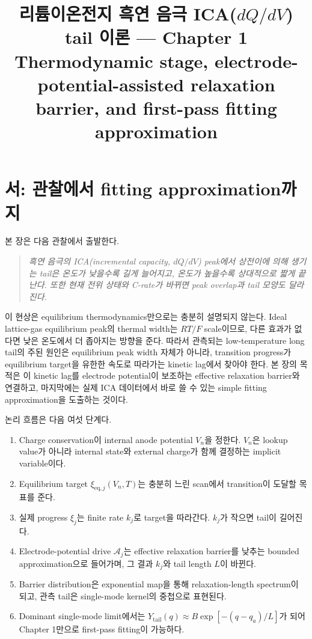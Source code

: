 \documentclass[11pt,a4paper]{article}
\title{\textbf{리튬이온전지 흑연 음극 ICA($dQ/dV$) tail 이론 --- Chapter 1}\\[0.4em]
\large Thermodynamic stage, electrode-potential-assisted relaxation barrier, and first-pass fitting approximation}
\author{}\date{}
\newcommand{\eq}{\mathrm{eq}}
\newcommand{\tail}{\mathrm{tail}}
\begin{document}
\maketitle

\section*{서: 관찰에서 fitting approximation까지}
본 장은 다음 관찰에서 출발한다.
\begin{quote}\itshape
흑연 음극의 ICA(incremental capacity, $dQ/dV$) peak에서 상전이에 의해 생기는 tail은 온도가 낮을수록 길게 늘어지고,
온도가 높을수록 상대적으로 짧게 끝난다. 또한 현재 전위 상태와 C-rate가 바뀌면 peak overlap과 tail 모양도 달라진다.
\end{quote}

이 현상은 equilibrium thermodynamics만으로는 충분히 설명되지 않는다. Ideal lattice-gas equilibrium peak의 thermal width는
$RT/F$ scale이므로, 다른 효과가 없다면 낮은 온도에서 더 좁아지는 방향을 준다. 따라서 관측되는 low-temperature long tail의
주된 원인은 equilibrium peak width 자체가 아니라, transition progress가 equilibrium target을 유한한 속도로 따라가는
kinetic lag에서 찾아야 한다. 본 장의 목적은 이 kinetic lag를 electrode potential이 보조하는 effective relaxation barrier와
연결하고, 마지막에는 실제 ICA 데이터에서 바로 쓸 수 있는 simple fitting approximation을 도출하는 것이다.

논리 흐름은 다음 여섯 단계다.
\begin{enumerate}[label=\textbf{(\arabic*)},leftmargin=2.2em]
\item Charge conservation이 internal anode potential $V_n$을 정한다. $V_n$은 lookup value가 아니라 internal state와 external charge가 함께 결정하는 implicit variable이다.
\item Equilibrium target $\xi_{\eq,j}(V_n,T)$는 충분히 느린 scan에서 transition이 도달할 목표를 준다.
\item 실제 progress $\xi_j$는 finite rate $k_j$로 target을 따라간다. $k_j$가 작으면 tail이 길어진다.
\item Electrode-potential drive $\mathcal A_j$는 effective relaxation barrier를 낮추는 bounded approximation으로 들어가며, 그 결과 $k_j$와 tail length $L$이 바뀐다.
\item Barrier distribution은 exponential map을 통해 relaxation-length spectrum이 되고, 관측 tail은 single-mode kernel의 중첩으로 표현된다.
\item Dominant single-mode limit에서는 $Y_{\tail}(q)\approx B\exp[-(q-q_a)/L]$가 되어 Chapter 1만으로 first-pass fitting이 가능하다.
\end{enumerate}
\end{document}
